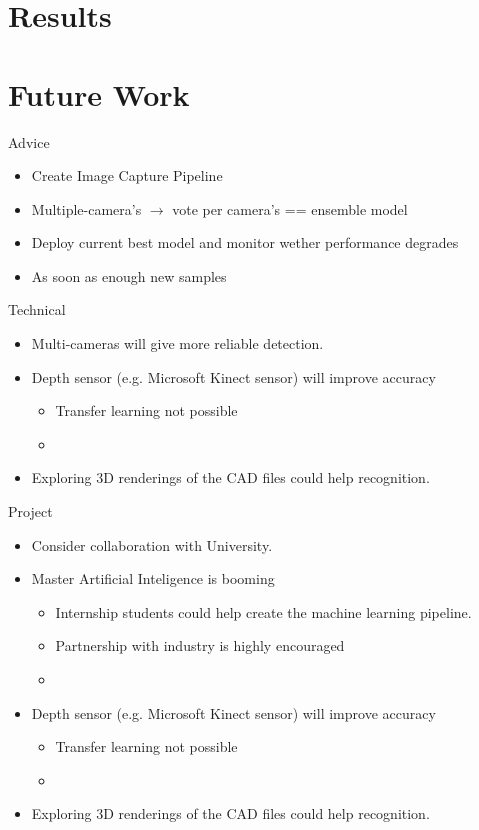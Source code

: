 \documentclass{beamer}
\begin{document}
\section{Results}
\section{Future Work}
\begin{frame}{Advice}
\begin{itemize}
  \item Create Image Capture Pipeline
  \item Multiple-camera's $\rightarrow$ vote per camera's == ensemble model
  \item Deploy current best model and monitor wether performance degrades
  \item As soon as enough new samples 
\end{itemize}
\end{frame}{}
\begin{frame}{Technical}
\begin{itemize}
 \item Multi-cameras will give more reliable detection.
 \item Depth sensor (e.g. Microsoft Kinect sensor) will improve accuracy 
  \begin{itemize}
  \item Transfer learning not possible
  \item 
  \end{itemize}
 \item Exploring 3D renderings of the CAD files could help recognition.
\end{itemize}
\end{frame}

\begin{frame}{Project}
\begin{itemize}
 \item Consider collaboration with University.
 \item Master Artificial Inteligence is booming
  \begin{itemize}
  \item Internship students could help create the machine learning pipeline.
  \item Partnership with industry is highly encouraged
  \item  
  \end{itemize}
 \item Depth sensor (e.g. Microsoft Kinect sensor) will improve accuracy 
  \begin{itemize}
  \item Transfer learning not possible
  \item 
  \end{itemize}
 \item Exploring 3D renderings of the CAD files could help recognition.
\end{itemize}
\end{frame}
\end{document}
